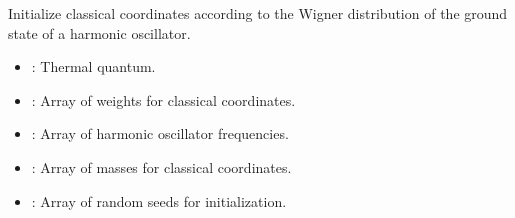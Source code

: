 \documentclass[letterpaper,10pt,english]{sphinxmanual}
\begin{document}
\begin{fulllineitems}
\label{\detokenize{software_reference/ingredients/ingredients:qc_lab.ingredients.harmonic_oscillator_wigner_init_classical}}
\pysigstartsignatures
\pysiglinewithargsret
{}
{\sphinxparamcomma {}\sphinxparamcomma {}\sphinxparamcomma {}}
{}
\pysigstopsignatures
\sphinxAtStartPar
Initialize classical coordinates according to the Wigner distribution of the ground state of a harmonic oscillator.
\begin{description}
\begin{itemize}
\item {} 
\sphinxAtStartPar
{}: Thermal quantum.

\item {} 
\sphinxAtStartPar
{}: Array of weights for classical coordinates.

\item {} 
\sphinxAtStartPar
{}: Array of harmonic oscillator frequencies.

\item {} 
\sphinxAtStartPar
{}: Array of masses for classical coordinates.

\end{itemize}

\begin{itemize}
\item {} 
\sphinxAtStartPar
{}: Array of random seeds for initialization.

\end{itemize}

\end{description}

\end{fulllineitems}
\end{document}
